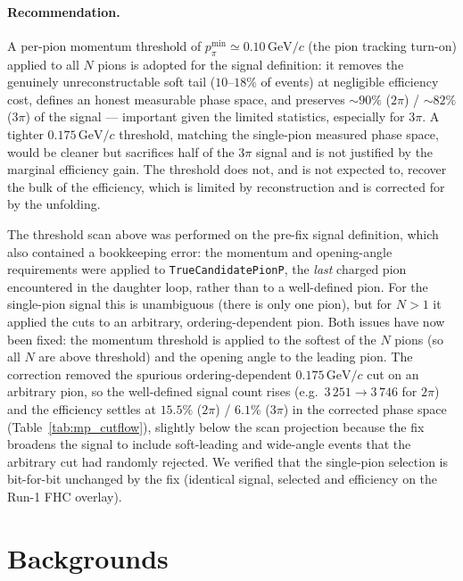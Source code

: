 \documentclass[11pt,a4paper]{article}
\newcommand{\GeVc}{\,\text{GeV}\!/c}
\begin{document}
\paragraph{Recommendation.} A per-pion momentum threshold of $p_\pi^{\min}\simeq0.10\GeVc$
(the pion tracking turn-on) applied to all $N$ pions is adopted for the signal definition:
it removes the genuinely unreconstructable soft tail ($10$--$18\%$ of events) at negligible
efficiency cost, defines an honest measurable phase space, and preserves $\sim\!90\%$
($2\pi$) / $\sim\!82\%$ ($3\pi$) of the signal --- important given the limited statistics,
especially for $3\pi$. A tighter $0.175\GeVc$ threshold, matching the single-pion measured
phase space, would be cleaner but sacrifices half of the $3\pi$ signal and is not justified
by the marginal efficiency gain. The threshold does not, and is not expected to, recover
the bulk of the efficiency, which is limited by reconstruction and is corrected for by the
unfolding.

The threshold scan above was performed on the pre-fix signal definition, which also
contained a bookkeeping error: the momentum and opening-angle requirements were applied to
\texttt{TrueCandidatePionP}, the \emph{last} charged pion encountered in the daughter loop,
rather than to a well-defined pion. For the single-pion signal this is unambiguous (there
is only one pion), but for $N>1$ it applied the cuts to an arbitrary, ordering-dependent
pion. Both issues have now been fixed: the momentum threshold is applied to the softest of
the $N$ pions (so all $N$ are above threshold) and the opening angle to the leading pion.
The correction removed the spurious ordering-dependent $0.175\GeVc$ cut on an arbitrary
pion, so the well-defined signal count rises (e.g.\ $3\,251\rightarrow3\,746$ for $2\pi$)
and the efficiency settles at $15.5\%$ ($2\pi$) / $6.1\%$ ($3\pi$) in the corrected phase
space (Table~\ref{tab:mp_cutflow}), slightly below the scan projection because the fix
broadens the signal to include soft-leading and wide-angle events that the arbitrary cut
had randomly rejected. We verified that the single-pion selection is bit-for-bit unchanged
by the fix (identical signal, selected and efficiency on the Run-1 FHC overlay).

\section{Backgrounds}
\label{sec:backgrounds}
\end{document}
